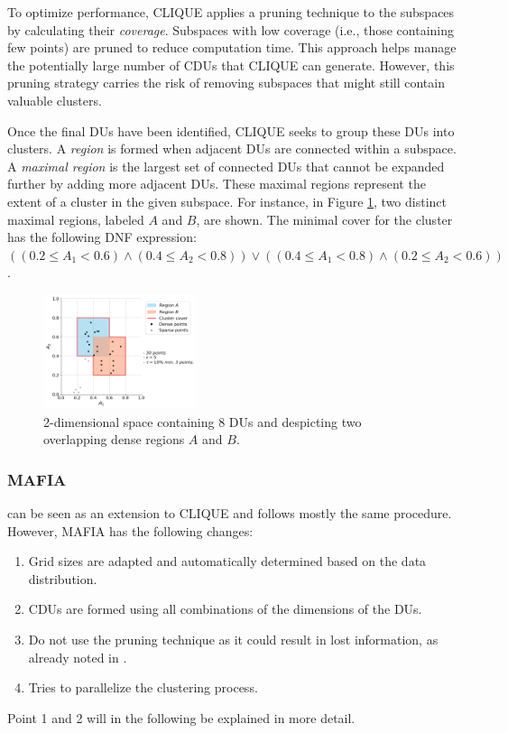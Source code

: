 To optimize performance, CLIQUE applies a pruning technique to the subspaces by calculating their \textit{coverage}. Subspaces with low coverage (i.e., those containing few points) are pruned to reduce computation time. This approach helps manage the potentially large number of CDUs that CLIQUE can generate. However, this pruning strategy carries the risk of removing subspaces that might still contain valuable clusters.

Once the final DUs have been identified, CLIQUE seeks to group these DUs into clusters. A \textit{region} is formed when adjacent DUs are connected within a subspace. A \textit{maximal region} is the largest set of connected DUs that cannot be expanded further by adding more adjacent DUs. These maximal regions represent the extent of a cluster in the given subspace. For instance, in Figure \ref{fig:dense_cells_and_regions}, two distinct maximal regions, labeled $A$ and $B$, are shown. The minimal cover for the cluster has the following DNF expression: $((0.2 \leq A_1 < 0.6) \land (0.4 \leq A_2 < 0.8)) \lor ((0.4 \leq A_1 < 0.8) \land (0.2 \leq A_2 < 0.6))$.
\begin{figure}[H]
    \vspace*{-0.5cm}
    \centering
    \includegraphics[width=0.4\textwidth]{figures/dense_cells_and_regions.png}
    \caption{2-dimensional space containing 8 DUs and despicting two overlapping dense regions $A$ and $B$.}
    \label{fig:dense_cells_and_regions}
    \vspace*{-0.5cm}
\end{figure}

\subsubsection{MAFIA}
can be seen as an extension to CLIQUE and follows mostly the same procedure. However, MAFIA has the following changes:
\begin{enumerate}
    \item Grid sizes are adapted and automatically determined based on the data distribution.
    \item CDUs are formed using all combinations of the dimensions of the DUs.
    \item Do not use the pruning technique as it could result in lost information, as already noted in \cite{clique}.
    \item Tries to parallelize the clustering process.
\end{enumerate}
Point 1 and 2 will in the following be explained in more detail.

